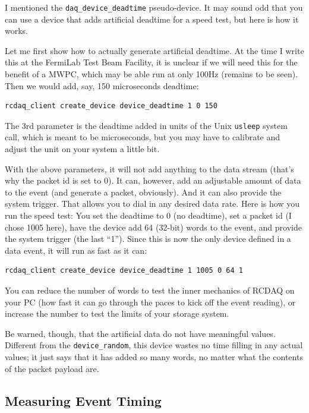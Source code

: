 \documentclass{article}[11pt]
\begin{document}
I mentioned the \verb|daq_device_deadtime| pseudo-device. It may sound
odd that you can use a device that adds artificial deadtime for a
speed test, but here is how it works.

Let me first show how to actually generate artificial deadtime. At the
time I write this at the FermiLab Test Beam Facility, it is unclear if
we will need this for the benefit of a MWPC, which may be able run at
only 100Hz (remains to be seen). Then we would add, say, 150 microseconds
deadtime:

\begin{verbatim}
rcdaq_client create_device device_deadtime 1 0 150
\end{verbatim}

The 3rd parameter is the deadtime added in units of the Unix \verb|usleep|
system call, which is meant to be microseconds, but you may have to calibrate and 
adjust the unit on your system a little bit.  

With the above parameters, it will not add anything to the data stream
(that's why the packet id is set to 0). It can, however, add an
adjustable amount of data to the event (and generate a packet,
obviously). And it can also provide the system trigger. That allows
you to dial in any desired data rate. Here is how you run the speed
test: You set the deadtime to 0 (no deadtime), set a packet id (I
chose 1005 here), have the device add 64 (32-bit) words to the event,
and provide the system trigger (the last ``1''). Since this is now the
only device defined in a data event, it will run as fast as it can:

\begin{verbatim}
rcdaq_client create_device device_deadtime 1 1005 0 64 1
\end{verbatim}

You can reduce the number of words to test the inner mechanics of
RCDAQ on your PC (how fast it can go through the paces to kick off the
event reading), or increase the number to test the limits of your
storage system. 

Be warned, though, that the artificial data do not have meaningful
values. Different from the \verb|device_random|, this device wastes
no time filling in any actual values; it just says that it has added
so many words, no matter what the contents of the packet payload are.

\subsection{Measuring Event Timing}
\label{eventtiming}
\end{document}
